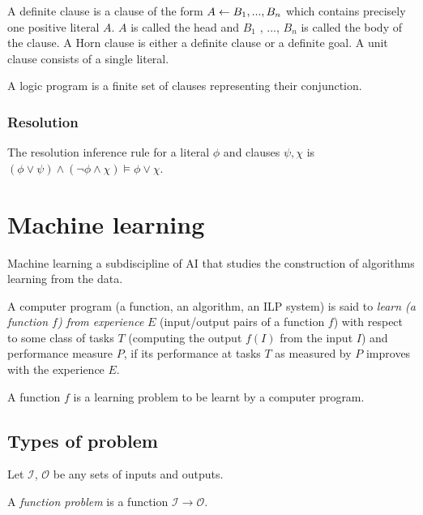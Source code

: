 \begin{defn}
A definite clause is a clause of the form
$A \leftarrow B_1 , ..., B_n$
which contains precisely one positive literal $A$.
$A$ is called the head and $B_1$ , ..., $B_n$ is called the body of the clause.
A Horn clause is either a definite clause or a definite goal.
A unit clause consists of a single literal.
\end{defn}

\begin{defn}
A logic program is a finite set of clauses representing their conjunction.
\end{defn}

\subsubsection{Resolution\cite{kimber2012learning}}
The resolution inference rule for a literal $\phi$ and clauses $\psi, \chi$ is
$(\phi \vee \psi) \wedge (\neg \phi \wedge \chi) \models \phi \vee \chi$.

\section{Machine learning}
Machine learning a subdiscipline of AI that studies the construction of algorithms learning from the data.

\begin{defn}\cite{mitchell1997machine}
A computer program (a function, an algorithm, an ILP system) is said to \emph{learn (a function $f$) from experience} $E$ (input/output pairs of a function $f$)
with respect to some class of tasks $T$ (computing the output $f(I)$ from the input $I$) and performance measure $P$,
if its performance at tasks $T$ as measured by $P$ improves with the experience $E$.
\end{defn}

\begin{remark}
A function $f$ is a learning problem to be learnt by a computer program.
\end{remark}

\subsection{Types of problem}
Let $\mathcal{I}$, $\mathcal{O}$ be any sets of inputs and outputs.

\begin{defn}
A \emph{function problem} is a function $\mathcal{I} \to \mathcal{O}$.
\end{defn}

